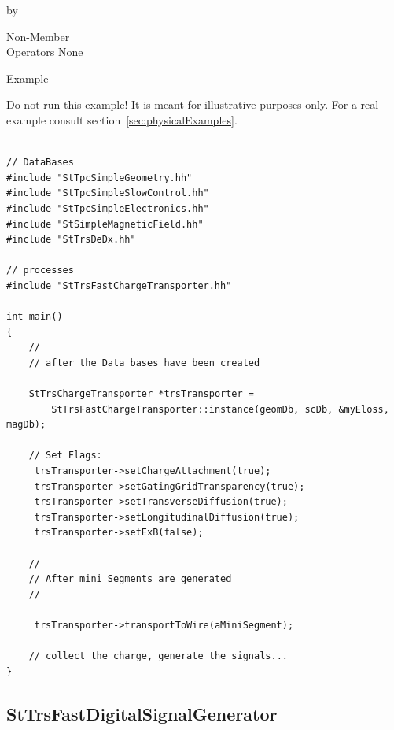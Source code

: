 \documentclass[twoside]{article}
\newcommand{\entrylabel}[1]{\mbox{\textbf{{#1}}}\hfil}%
\newenvironment{entry}
{\begin{list}{}%
    {\renewcommand{\makelabel}{\entrylabel}%
     \setlength{\labelwidth}{90pt}%
     \setlength{\leftmargin}{\labelwidth}
     \advance\leftmargin by \labelsep%
      }%
    }%
  {\end{list}}
\newcommand{\Entrylabel}[1]%
{\raisebox{0pt}[1ex][0pt]{\makebox[\labelwidth][l]%
    {\parbox[t]{\labelwidth}{\hspace{0pt}\textbf{{#1}}}}}}
\newenvironment{Entry}%
{\renewcommand{\entrylabel}{\Entrylabel}\begin{entry}}%
  {\end{entry}}
\begin{document}
\begin{Entry}
\item[Non-Member \\ Operators]
  None

\item[Example]

Do not run this example!  It is meant for illustrative purposes only.
For a real example consult section~\ref{sec:physicalExamples}.

{\footnotesize
\begin{verbatim}

// DataBases
#include "StTpcSimpleGeometry.hh"
#include "StTpcSimpleSlowControl.hh"
#include "StTpcSimpleElectronics.hh"
#include "StSimpleMagneticField.hh"
#include "StTrsDeDx.hh"

// processes
#include "StTrsFastChargeTransporter.hh"

int main()
{
    //
    // after the Data bases have been created

    StTrsChargeTransporter *trsTransporter =
        StTrsFastChargeTransporter::instance(geomDb, scDb, &myEloss, magDb);

    // Set Flags:
     trsTransporter->setChargeAttachment(true);
     trsTransporter->setGatingGridTransparency(true);
     trsTransporter->setTransverseDiffusion(true);
     trsTransporter->setLongitudinalDiffusion(true);
     trsTransporter->setExB(false);

    //
    // After mini Segments are generated
    //
    
     trsTransporter->transportToWire(aMiniSegment);

    // collect the charge, generate the signals...
}
\end{verbatim}
}%


\end{Entry}
\clearpage

%
%
\subsection{StTrsFastDigitalSignalGenerator} 
\label{sec:stTrsFastDigitalSignalGenerator}
\end{document}
